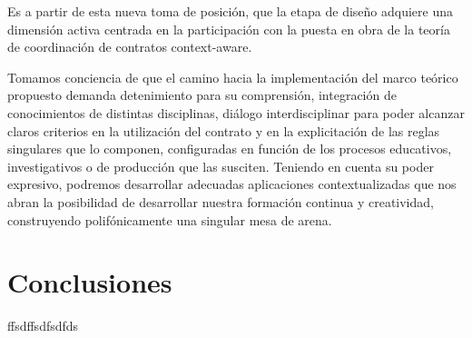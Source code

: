 Es a partir de esta nueva toma de posición, que la etapa de diseño adquiere
una dimensión activa centrada en la participación con la puesta en obra de
la teoría de coordinación de contratos context-aware.

Tomamos conciencia de que el camino hacia la implementación del
marco teórico propuesto demanda detenimiento para su comprensión, integración
de conocimientos de distintas disciplinas, diálogo interdisciplinar
para poder alcanzar claros criterios en la utilización del contrato y en la explicitación
de las reglas singulares que lo componen, configuradas en función de
los procesos educativos, investigativos o de producción que las susciten.
Teniendo en cuenta su poder expresivo, podremos desarrollar adecuadas
aplicaciones contextualizadas que nos abran la posibilidad de desarrollar nuestra
formación continua y creatividad, construyendo polifónicamente una singular
mesa de arena.


\section{Conclusiones}


ffsdffsdfsdfds


